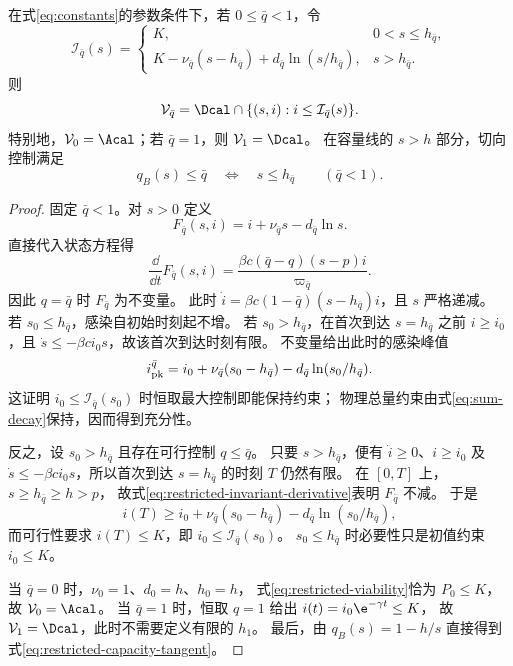 \begin{proposition}[受限能力下的约束可行域]
\label{prop:restricted-feasibility}
在式\eqref{eq:constants}的参数条件下，若 $0\le\bar q<1$，令
\begin{equation}
 \mathcal I_{\bar q}(s)=
 \begin{cases}
  K,&0<s\le h_{\bar q},\\[1mm]
  K-\nu_{\bar q}(s-h_{\bar q})
       +d_{\bar q}\ln(s/h_{\bar q}),&s>h_{\bar q}.
 \end{cases}
 \label{eq:restricted-envelope}
\end{equation}
则
\begin{equation}
 \mathcal V_{\bar q}
   =\Dcal\cap\{(s,i):i\le\mathcal I_{\bar q}(s)\}.
 \label{eq:restricted-viability}
\end{equation}
特别地，$\mathcal V_0=\Acal$；若 $\bar q=1$，则 $\mathcal V_1=\Dcal$。
在容量线的 $s>h$ 部分，切向控制满足
\begin{equation}
 q_B(s)\le\bar q\quad\Longleftrightarrow\quad s\le h_{\bar q}
 \qquad(\bar q<1).
 \label{eq:restricted-capacity-tangent}
\end{equation}
\end{proposition}
\begin{proof}
固定 $\bar q<1$。对 $s>0$ 定义
\[
 F_{\bar q}(s,i)=i+\nu_{\bar q}s-d_{\bar q}\ln s.
\]
直接代入状态方程得
\begin{equation}
 \frac{\dd}{\dd t}F_{\bar q}(s,i)
 =\frac{\beta c(\bar q-q)(s-p)i}{\varpi_{\bar q}}.
 \label{eq:restricted-invariant-derivative}
\end{equation}
因此 $q=\bar q$ 时 $F_{\bar q}$ 为不变量。
此时 $\dot i=\beta c(1-\bar q)(s-h_{\bar q})i$，且 $s$ 严格递减。
若 $s_0\le h_{\bar q}$，感染自初始时刻起不增。
若 $s_0>h_{\bar q}$，在首次到达 $s=h_{\bar q}$ 之前 $i\ge i_0$，且
$\dot s\le-\beta c i_0s$，故该首次到达时刻有限。
不变量给出此时的感染峰值
\[
 i_{\rm pk}^{\bar q}
 =i_0+\nu_{\bar q}(s_0-h_{\bar q})
          -d_{\bar q}\ln(s_0/h_{\bar q}).
\]
这证明 $i_0\le\mathcal I_{\bar q}(s_0)$ 时恒取最大控制即能保持约束；
物理总量约束由式\eqref{eq:sum-decay}保持，因而得到充分性。

反之，设 $s_0>h_{\bar q}$ 且存在可行控制 $q\le\bar q$。
只要 $s>h_{\bar q}$，便有 $\dot i\ge0$、$i\ge i_0$ 及
$\dot s\le-\beta c i_0s$，所以首次到达 $s=h_{\bar q}$ 的时刻 $T$ 仍然有限。
在 $[0,T]$ 上，$s\ge h_{\bar q}\ge h>p$，
故式\eqref{eq:restricted-invariant-derivative}表明 $F_{\bar q}$ 不减。
于是
\[
 i(T)\ge i_0+\nu_{\bar q}(s_0-h_{\bar q})
                  -d_{\bar q}\ln(s_0/h_{\bar q}),
\]
而可行性要求 $i(T)\le K$，即 $i_0\le\mathcal I_{\bar q}(s_0)$。
$s_0\le h_{\bar q}$ 时必要性只是初值约束 $i_0\le K$。

当 $\bar q=0$ 时，$\nu_0=1$、$d_0=h$、$h_0=h$，
式\eqref{eq:restricted-viability}恰为 $P_0\le K$，故 $\mathcal V_0=\Acal$。
当 $\bar q=1$ 时，恒取 $q=1$ 给出 $i(t)=i_0\e^{-\gamma t}\le K$，
故 $\mathcal V_1=\Dcal$，此时不需要定义有限的 $h_1$。
最后，由 $q_B(s)=1-h/s$ 直接得到式\eqref{eq:restricted-capacity-tangent}。
\end{proof}

